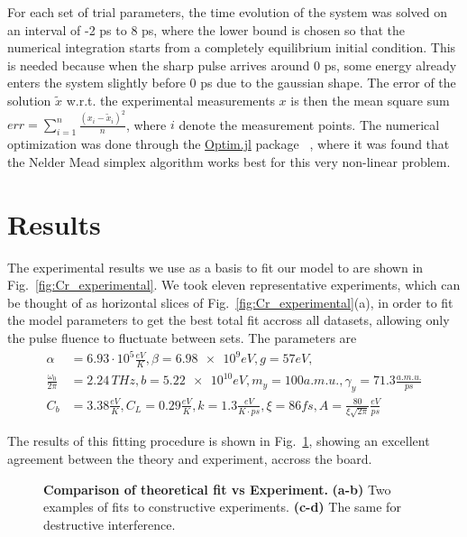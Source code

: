 For each set of trial parameters, the time evolution of the system was solved on an interval of -2 ps to 8 ps, where the lower bound is chosen so that the numerical integration starts from a completely equilibrium initial condition.
This is needed because when the sharp pulse arrives around 0 ps, some energy already enters the system slightly before 0 ps due to the gaussian shape.
The error of the solution $\tilde{x}$ w.r.t. the experimental measurements $x$ is then the mean square sum $err = \sum_{i=1}^n \frac{(x_i - \tilde{x}_i)^2}{n}$, where $i$ denote the measurement points.
The numerical optimization was done through the \href{https://github.com/JuliaNLSolvers/Optim.jl}{Optim.jl} package ~\cite{mogensen2018optim}, where it was found that the Nelder Mead simplex algorithm \cite{Nelder1965} works best for this very non-linear problem.

\section{Results}
The experimental results we use as a basis to fit our model to are shown in Fig.~\ref{fig:Cr_experimental}.
We took eleven representative experiments, which can be thought of as horizontal slices of Fig.~\ref{fig:Cr_experimental}(a), in order to fit the model parameters to get the best total fit accross all datasets, allowing only the pulse fluence to fluctuate between sets.
The parameters are
\begin{align}
	\alpha &= 6.93 \cdot 10^5 \frac{eV}{K}, \beta = \SI{6.98e9} eV, g = 57 eV, \\
	\frac{\omega_0}{2\pi} &= 2.24\, THz, b = \SI{5.22e10} eV, m_y = 100 a.m.u., \gamma_y = 71.3 \frac{a.m.u.}{ps}\\
	C_b &= 3.38 \frac{eV}{K}, C_L = 0.29 \frac{eV}{K}, k = 1.3 \frac{eV}{K\cdot ps}, \xi = 86 fs, A = \frac{80}{\xi \sqrt{2\pi}} \frac{eV}{ps} 
\end{align}

The results of this fitting procedure is shown in Fig.~\ref{fig:Cr_theoretical_fit}, showing an excellent agreement between the theory and experiment, accross the board.
\begin{figure}
\caption{\label{fig:Cr_theoretical_fit} {\bf Comparison of theoretical fit vs Experiment.} {\bf (a-b)} Two examples of fits to constructive experiments. {\bf (c-d)} The same for destructive interference.}
\end{figure}

